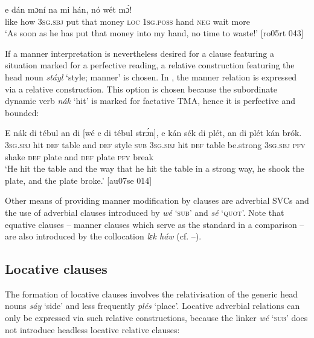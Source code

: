 \ea%
    \label{ex:key:1487}
    \gll {}     e      dán  mɔní  na  mi    hán,    nó  wét    mɔ́!\\
like  how    \textsc{3sg.sbj}  put  that  money  \textsc{loc}  \textsc{1sg.poss}  hand  \textsc{neg}  wait    more\\

\glt ‘As soon as he has put that money into my hand, no time to waste!’ [ro05rt 043]
\z

If a manner interpretation is nevertheless desired for a clause featuring a situation marked for a perfective reading, a relative construction featuring the head noun \textit{stáyl} ‘style; manner’ is chosen. In , the manner relation is expressed via a relative construction. This option is chosen because the subordinate dynamic verb \textit{nák} ‘hit’ is marked for factative TMA, hence it is perfective and bounded: 


\ea%
    \label{ex:key:1488}
    \gll E    nák  di  tébul  an  di   [wé\textstylePichiexamplebold{}   e      di  tébul
strɔ́n],    e    kán  sék    di  plét,    an  di  plét    kán  brók.\\
\textsc{3sg.sbj}  hit  \textsc{def}  table  and   \textsc{def}  style   \textsc{sub}    3\textsc{sg.sbj}  hit  \textsc{def}  table
be.strong   \textsc{3sg.sbj}  \textsc{pfv}  shake  \textsc{def}  plate  and  \textsc{def}  plate  \textsc{pfv}  break\\

\glt ‘He hit the table and the way that he hit the table in a strong way, he shook the plate,
and the plate broke.’ [au07se 014]
\z

Other means of providing manner modification by clauses are adverbial SVCs and the use of adverbial clauses introduced by \textit{wé} ‘\textsc{sub}’ and \textit{sé} ‘\textsc{quot}’. Note that equative clauses – manner clauses which serve as the standard in a comparison – are also introduced by the collocation \textit{lɛk háw} (cf. –).

\subsection{Locative clauses}

The formation of locative clauses involves the relativisation of the generic head nouns \textit{sáy} ‘side’ and less frequently \textit{plés} ‘place’. Locative adverbial relations can only be expressed via such relative constructions, because the linker \textit{wé} ‘\textsc{sub}’ does not introduce headless locative relative clauses: 


